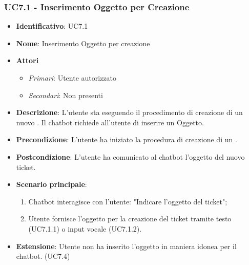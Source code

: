 \subsubsection{UC7.1 - Inserimento Oggetto per Creazione }
\begin{itemize}
	\item \textbf{Identificativo}: UC7.1
	\item \textbf{Nome}: Inserimento Oggetto per creazione  
	\item \textbf{Attori}
	\begin{itemize} 
		\item \textit{Primari}: Utente autorizzato
		\item \textit{Secondari}: Non presenti
	\end{itemize}
	\item \textbf{Descrizione}: L'utente sta eseguendo il procedimento di creazione di un nuovo . Il chatbot richiede all'utente di inserire un Oggetto. 
	\item \textbf{Precondizione}: L'utente ha iniziato la procedura di creazione di un .
	\item \textbf{Postcondizione}: L'utente ha comunicato al chatbot l'oggetto del nuovo ticket.
	\item \textbf{Scenario principale}: \begin{enumerate}
		\item Chatbot interagisce con l'utente: "Indicare l'oggetto del ticket";
		\item Utente fornisce l'oggetto per la creazione del ticket tramite testo (UC7.1.1) o input vocale (UC7.1.2). 
	\end{enumerate}
	\item \textbf{Estensione}: Utente non ha inserito l'oggetto in maniera idonea per il chatbot. (UC7.4)		
\end{itemize}

